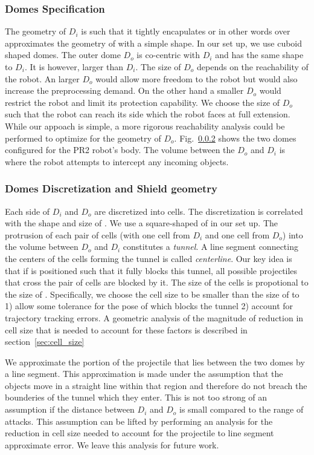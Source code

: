 \documentclass[a4paper]{report}
\begin{document}
\subsubsection{Domes Specification}
The geometry of $D_i$ is such that it tightly encapulates \calB or in other words over approximates the geometry of \calB with a simple shape. In our set up, we use cuboid shaped domes. The outer dome $D_o$ is co-centric with $D_i$ and has the same shape to $D_i$. It is however, larger than $D_i$. The size of $D_o$ depends on the reachability of the robot. An larger $D_o$ would allow more freedom to the robot but would also increase the preprocessing demand. On the other hand a smaller $D_o$ would restrict the robot and limit its protection capability.
We choose the size of $D_o$ such that the robot can reach its side which the robot faces at full extension. While our appoach is simple, a more rigorous reachability analysis could be performed to optimize for the geometry of $D_o$.
Fig.~\ref{} shows the two domes configured for the PR2 robot's body. The volume between the $D_o$ and $D_i$ is where the robot attempts to intercept any incoming objects. 

\subsubsection{Domes Discretization and Shield geometry}
Each side of $D_i$ and $D_o$ are discretized into cells. The discretization is correlated with the shape and size of \calS. We use a square-shaped \calS of in our set up.
%
The protrusion of each pair of cells (with one cell from $D_i$ and one cell from $D_o$) into the volume between $D_o$ and $D_i$ constitutes a \emph{tunnel}. A line segment connecting the centers of the cells forming the tunnel is called \emph{centerline}. Our key idea is that if \calS is positioned such that it fully blocks this tunnel, all possible projectiles that cross the pair of cells are blocked by it.
%
The size of the cells is propotional to the size of \calS. Specifically, we choose the cell size to be smaller than the size of \calS to 1) allow some tolerance for the pose of \calS which blocks the tunnel 2) account for trajectory tracking errors.
%
A geometric analysis of the magnitude of reduction in cell size that is needed to account for these factors is described in section~\ref{sec:cell_size}

We approximate the portion of the projectile that lies between the two domes by a line segment. This approximation is made under the assumption that the objects move in a straight line within that region and therefore do not breach the bounderies of the tunnel which they enter. This is not too strong of an assumption if the distance between $D_i$ and $D_o$ is small compared to the range of attacks.
This assumption can be lifted by performing an analysis for the reduction in cell size needed to account for the projectile to line segment approximate error. We leave this analysis for future work.
%
\end{document}
